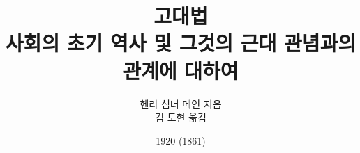 \documentclass[b5paper]{book}
\begin{document}
\title{고대법\\
\large 사회의 초기 역사 및 그것의 근대 관념과의 관계에 대하여}
\author{헨리 섬너 메인 지음\\
김 도현 옮김}
\date{1920 (1861)}

\frontmatter

\maketitle
\tableofcontents

\mainmatter











\end{document}
